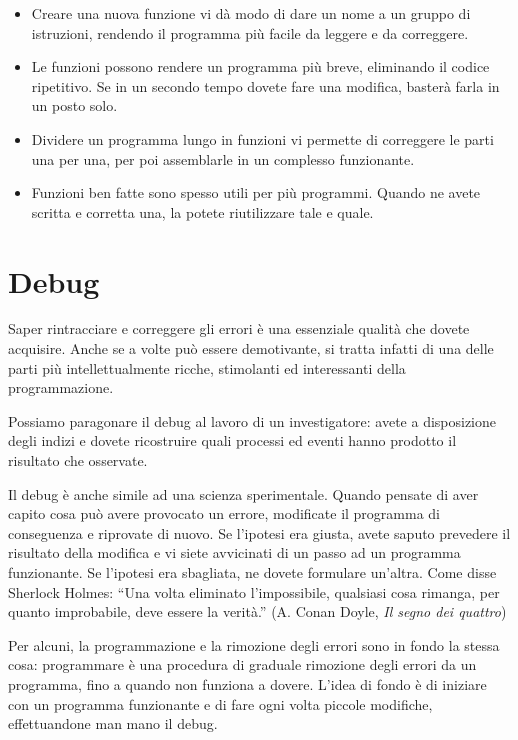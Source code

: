 \documentclass[10pt]{book}
\begin{document}
\begin{itemize}

\item Creare una nuova funzione vi dà modo di dare un nome a un gruppo di istruzioni, rendendo il programma più facile da leggere e da correggere.

\item Le funzioni possono rendere un programma più breve, eliminando il codice ripetitivo. Se in un secondo tempo dovete fare una modifica, basterà farla in un posto solo.

\item Dividere un programma lungo in funzioni vi permette di correggere le parti una per una, per poi assemblarle in un complesso funzionante.

\item Funzioni ben fatte sono spesso utili per più programmi. Quando ne avete scritta e corretta una, la potete riutilizzare tale e quale.

\end{itemize}


\section{Debug}
\label{editor}

Saper rintracciare e correggere gli errori è una essenziale qualità che dovete acquisire. Anche se a volte può essere demotivante, si tratta infatti di una delle parti più intellettualmente ricche, stimolanti ed interessanti della programmazione.

Possiamo paragonare il debug al lavoro di un investigatore: avete a disposizione degli indizi e dovete ricostruire quali processi ed eventi hanno prodotto il risultato che osservate.

Il debug è anche simile ad una scienza sperimentale. Quando pensate di aver capito cosa può avere provocato un errore, modificate il programma di conseguenza e riprovate di nuovo. Se l'ipotesi era giusta, avete saputo prevedere il risultato della modifica e vi siete avvicinati di un passo ad un programma funzionante. Se l'ipotesi era sbagliata, ne dovete formulare un'altra. Come disse Sherlock Holmes: ``Una volta eliminato l'impossibile, qualsiasi cosa rimanga, per quanto improbabile, deve essere la verità.''
(A. Conan Doyle, {\em Il segno dei quattro})

Per alcuni, la programmazione e la rimozione degli errori sono in fondo la stessa cosa: programmare è una procedura di graduale rimozione degli errori da un programma, fino a quando non funziona a dovere. L'idea di fondo è di iniziare con un programma funzionante e di fare ogni volta piccole modifiche, effettuandone man mano il debug.
\end{document}
